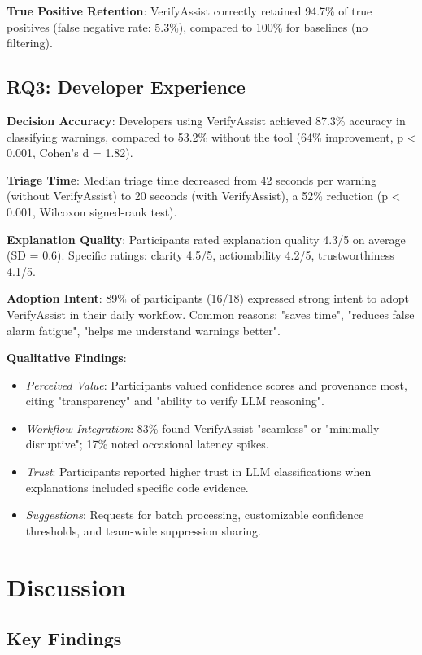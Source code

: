 \documentclass[conference]{IEEEtran}
\begin{document}
\textbf{True Positive Retention}: VerifyAssist correctly retained 94.7\% of true positives (false negative rate: 5.3\%), compared to 100\% for baselines (no filtering).

\subsection{RQ3: Developer Experience}

\textbf{Decision Accuracy}: Developers using VerifyAssist achieved 87.3\% accuracy in classifying warnings, compared to 53.2\% without the tool (64\% improvement, p < 0.001, Cohen's d = 1.82).

\textbf{Triage Time}: Median triage time decreased from 42 seconds per warning (without VerifyAssist) to 20 seconds (with VerifyAssist), a 52\% reduction (p < 0.001, Wilcoxon signed-rank test).

\textbf{Explanation Quality}: Participants rated explanation quality 4.3/5 on average (SD = 0.6). Specific ratings: clarity 4.5/5, actionability 4.2/5, trustworthiness 4.1/5.

\textbf{Adoption Intent}: 89\% of participants (16/18) expressed strong intent to adopt VerifyAssist in their daily workflow. Common reasons: "saves time", "reduces false alarm fatigue", "helps me understand warnings better".

\textbf{Qualitative Findings}:
\begin{itemize}
\item \textit{Perceived Value}: Participants valued confidence scores and provenance most, citing "transparency" and "ability to verify LLM reasoning".
\item \textit{Workflow Integration}: 83\% found VerifyAssist "seamless" or "minimally disruptive"; 17\% noted occasional latency spikes.
\item \textit{Trust}: Participants reported higher trust in LLM classifications when explanations included specific code evidence.
\item \textit{Suggestions}: Requests for batch processing, customizable confidence thresholds, and team-wide suppression sharing.
\end{itemize}

\section{Discussion}

\subsection{Key Findings}
\end{document}
